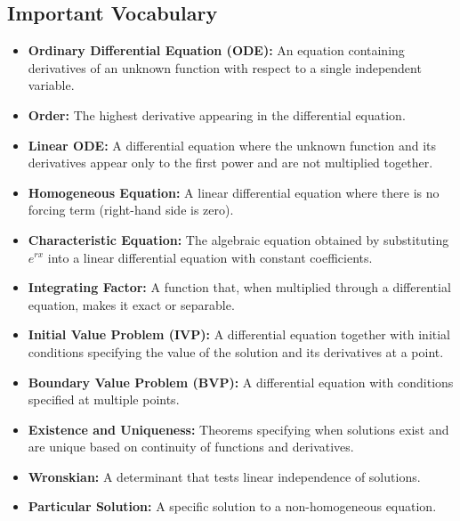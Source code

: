 \subsection*{Important Vocabulary}
\begin{itemize}
    \item \textbf{Ordinary Differential Equation (ODE):} An equation containing derivatives of an unknown function with respect to a single independent variable.
    
    \item \textbf{Order:} The highest derivative appearing in the differential equation.
    
    \item \textbf{Linear ODE:} A differential equation where the unknown function and its derivatives appear only to the first power and are not multiplied together.
    
    \item \textbf{Homogeneous Equation:} A linear differential equation where there is no forcing term (right-hand side is zero).
    
    \item \textbf{Characteristic Equation:} The algebraic equation obtained by substituting $e^{rx}$ into a linear differential equation with constant coefficients.
    
    \item \textbf{Integrating Factor:} A function that, when multiplied through a differential equation, makes it exact or separable.
    
    \item \textbf{Initial Value Problem (IVP):} A differential equation together with initial conditions specifying the value of the solution and its derivatives at a point.
    
    \item \textbf{Boundary Value Problem (BVP):} A differential equation with conditions specified at multiple points.
    
    \item \textbf{Existence and Uniqueness:} Theorems specifying when solutions exist and are unique based on continuity of functions and derivatives.
    
    \item \textbf{Wronskian:} A determinant that tests linear independence of solutions.
    
    \item \textbf{Particular Solution:} A specific solution to a non-homogeneous equation.
    

\end{itemize}
